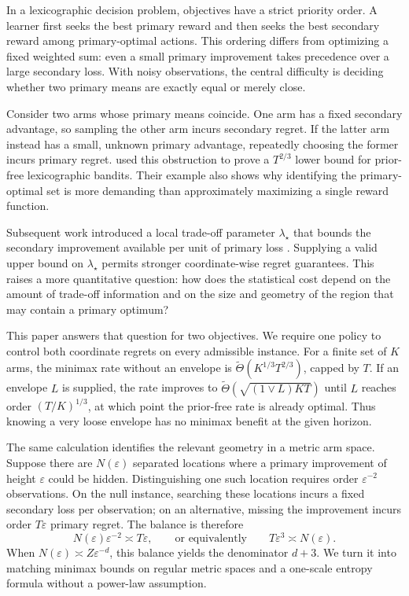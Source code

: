 \documentclass[11pt]{article}
\theoremstyle{definition}
\newcommand{\eps}{\varepsilon}
\begin{document}
In a lexicographic decision problem, objectives have a strict priority
order. A learner first seeks the best primary reward and then seeks the
best secondary reward among primary-optimal actions. This ordering differs
from optimizing a fixed weighted sum: even a small primary improvement
takes precedence over a large secondary loss. With noisy observations,
the central difficulty is deciding whether two primary means are exactly
equal or merely close.

Consider two arms whose primary means coincide. One arm has a fixed
secondary advantage, so sampling the other arm incurs secondary regret.
If the latter arm instead has a small, unknown primary advantage, repeatedly
choosing the former incurs primary regret. \citet{huyuk2021lexicographic} used this obstruction to prove a
$T^{2/3}$ lower bound for prior-free lexicographic bandits. Their example
also shows why identifying the primary-optimal set is more demanding than
approximately maximizing a single reward function.

Subsequent work introduced a local trade-off parameter $\lambda_\star$
that bounds the secondary improvement available per unit of primary loss
\citep{xue2024lipschitz,xue2025jmlr}. Supplying a valid upper bound on
$\lambda_\star$ permits stronger coordinate-wise regret guarantees.
This raises a more quantitative question: how does the statistical cost
depend on the amount of trade-off information and on the size and geometry
of the region that may contain a primary optimum?

This paper answers that question for two objectives. We require one policy
to control both coordinate regrets on every admissible instance. For a
finite set of $K$ arms, the minimax rate without an envelope is
$\widetilde\Theta(K^{1/3}T^{2/3})$, capped by $T$. If an envelope $L$ is
supplied, the rate improves to $\widetilde\Theta(\sqrt{(1\vee L)KT})$
until $L$ reaches order $(T/K)^{1/3}$, at which point the prior-free rate
is already optimal. Thus knowing a very loose envelope has no minimax
benefit at the given horizon.

The same calculation identifies the relevant geometry in a metric arm
space. Suppose there are $N(\eps)$ separated locations where a primary
improvement of height $\eps$ could be hidden. Distinguishing one such
location requires order $\eps^{-2}$ observations. On the null instance,
searching these locations incurs a fixed secondary loss per observation;
on an alternative, missing the improvement incurs order $T\eps$ primary
regret. The balance is therefore
\begin{equation}
\label{eq:intro-balance}
  N(\eps)\eps^{-2}\asymp T\eps,
  \qquad\text{or equivalently}\qquad
  T\eps^3\asymp N(\eps).
\end{equation}
When $N(\eps)\asymp Z\eps^{-d}$, this balance yields the denominator
$d+3$. We turn it into matching minimax bounds on regular metric spaces
and a one-scale entropy formula without a power-law assumption.
\end{document}
